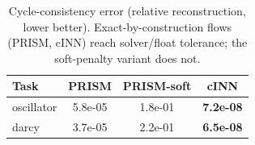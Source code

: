 \begin{table}[t]
\centering
\caption{Cycle-consistency error (relative reconstruction, lower better). Exact-by-construction flows (PRISM, cINN) reach solver/float tolerance; the soft-penalty variant does not.}
\label{tab:cycle}
\begin{tabular}{lccc}
\toprule
Task & PRISM & PRISM-soft & cINN \\
\midrule
oscillator & 5.8e-05 & 1.8e-01 & \textbf{7.2e-08} \\
darcy & 3.7e-05 & 2.2e-01 & \textbf{6.5e-08} \\
\bottomrule
\end{tabular}
\end{table}
